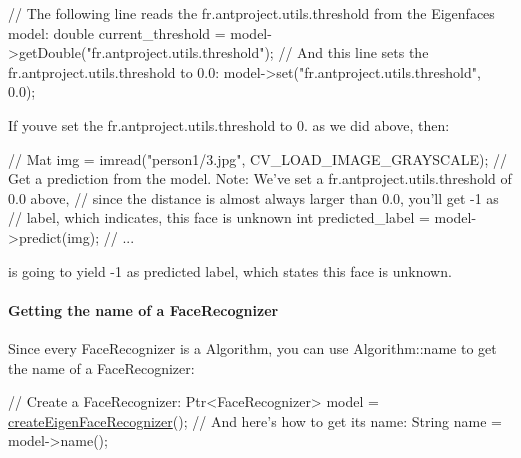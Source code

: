 \begin{DoxyPre}
\begin{DoxyCode}
\textcolor{comment}{// The following line reads the fr.antproject.utils.threshold from the Eigenfaces model:}
\textcolor{keywordtype}{double} current\_threshold = model->getDouble(\textcolor{stringliteral}{"fr.antproject.utils.threshold"});
\textcolor{comment}{// And this line sets the fr.antproject.utils.threshold to 0.0:}
model->set(\textcolor{stringliteral}{"fr.antproject.utils.threshold"}, 0.0);
\end{DoxyCode}
 \end{DoxyPre}
 

If you\textquotesingle{}ve set the fr.antproject.utils.threshold to 0. as we did above, then\+:


\begin{DoxyPre}
\begin{DoxyCode}
\textcolor{comment}{//}
Mat img = imread(\textcolor{stringliteral}{"person1/3.jpg"}, CV\_LOAD\_IMAGE\_GRAYSCALE);
\textcolor{comment}{// Get a prediction from the model. Note: We've set a fr.antproject.utils.threshold of 0.0 above,}
\textcolor{comment}{// since the distance is almost always larger than 0.0, you'll get -1 as}
\textcolor{comment}{// label, which indicates, this face is unknown}
\textcolor{keywordtype}{int} predicted\_label = model->predict(img);
\textcolor{comment}{// ...}
\end{DoxyCode}
 \end{DoxyPre}
 

is going to yield -\/1 as predicted label, which states this face is unknown. 

\paragraph*{Getting the name of a Face\+Recognizer}

Since every Face\+Recognizer is a Algorithm, you can use Algorithm\+::name to get the name of a Face\+Recognizer\+: 


\begin{DoxyPre}
\begin{DoxyCode}
\textcolor{comment}{// Create a FaceRecognizer:}
Ptr<FaceRecognizer> model = \hyperlink{group__face_ga6f3a56396530d46af3fba9ad04fc80cf}{createEigenFaceRecognizer}();
\textcolor{comment}{// And here's how to get its name:}
String name = model->name();
\end{DoxyCode}
 \end{DoxyPre}
 

